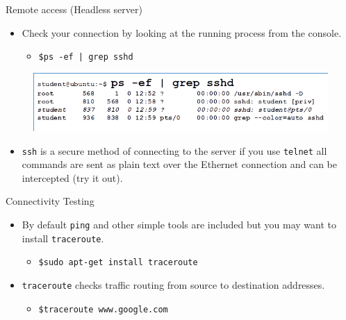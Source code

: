 \documentclass[aspectratio=169]{beamer}
\begin{document}
\begin{frame}{Remote access (Headless server)}
  \begin{itemize}
    \item Check your connection by looking at the running process from the console.
      \begin{itemize}
        \item \texttt{\$ps -ef | grep sshd}
      \end{itemize}
  \end{itemize}
  \begin{figure}
    \begin{center}
      \includegraphics[width=.9\linewidth]{ps.png}
    \end{center}
  \end{figure}
  \begin{itemize}
      \item \texttt{ssh} is a secure method of connecting to the server if you use \texttt{telnet} all commands are sent as plain text over the Ethernet connection and can be intercepted (try it out).
  \end{itemize}
\end{frame}

\begin{frame}{Connectivity Testing}
  \begin{itemize}
    \item By default \texttt{ping} and other simple tools are included but you may want to install \texttt{traceroute}. 
      \begin{itemize}
        \item \texttt{\$sudo apt-get install traceroute}
      \end{itemize}
    \item \texttt{traceroute} checks traffic routing from source to destination addresses.
      \begin{itemize}
        \item \texttt{\$traceroute www.google.com}
      \end{itemize}
  \end{itemize}
\end{frame}
\end{document}
